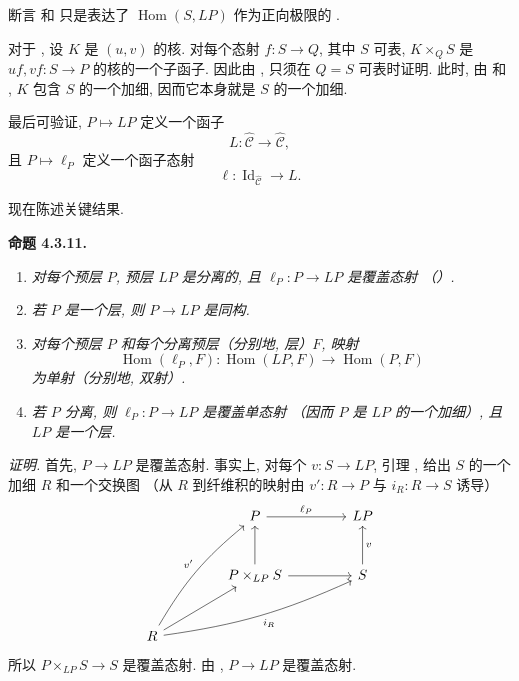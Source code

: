 断言  和
只是表达了 \(\operatorname{Hom}(S,LP)\) 作为正向极限的
.

对于 ,
设 \(K\) 是 \((u,v)\) 的核.
对每个态射 \(f:S\to Q\), 其中 \(S\) 可表,
\(K\times_QS\) 是 \(uf,vf:S\to P\) 的核的一个子函子.
因此由 ,
只须在 \(Q=S\) 可表时证明.
此时, 由  和
,
\(K\) 包含 \(S\) 的一个加细, 因而它本身就是 \(S\) 的一个加细.

最后可验证, \(P\mapsto LP\) 定义一个函子
\[
 L:\widehat{\mathscr C}\longrightarrow\widehat{\mathscr C},
\]
且 \(P\mapsto\ell_P\) 定义一个函子态射
\[
 \ell:\operatorname{Id}_{\widehat{\mathscr C}}\longrightarrow L.
\]

现在陈述关键结果.

\medskip
\noindent{}\textbf{命题 4.3.11.}
\begin{enumerate}
 \item[(i)] \textit{对每个预层
 \(P\), 预层 \(LP\) 是分离的, 且 \(\ell_P:P\to LP\) 是覆盖态射
 （）.}
 \item[(ii)] \textit{若 \(P\)
 是一个层, 则 \(P\to LP\) 是同构.}
 \item[(iii)] \textit{对每个预层
 \(P\) 和每个分离预层（分别地, 层）\(F\), 映射}
 \[
  \operatorname{Hom}(\ell_P,F):
  \operatorname{Hom}(LP,F)\longrightarrow\operatorname{Hom}(P,F)
 \]
 \textit{为单射（分别地, 双射）.}
 \item[(iv)] \textit{若 \(P\)
 分离, 则 \(\ell_P:P\to LP\) 是覆盖单态射
 （因而 \(P\) 是 \(LP\) 的一个加细）, 且 \(LP\) 是一个层.}
\end{enumerate}

\noindent\textit{证明.}
 首先,
\(P\to LP\) 是覆盖态射. 事实上, 对每个 \(v:S\to LP\),
引理 ,
给出 \(S\) 的一个加细 \(R\) 和一个交换图
（从 \(R\) 到纤维积的映射由 \(v':R\to P\) 与 \(i_R:R\to S\) 诱导）
\[
\begin{tikzcd}[column sep=4.2em,row sep=2.8em]
 {}
 &
 P
   \arrow[r,"\ell_P"]
 &
 LP
 \\
 {}
 &
 P\times_{LP}S
   \arrow[u]
   \arrow[r]
 &
 S
   \arrow[u,"v"']
 \\
 R
   \arrow[ru]
   \arrow[ruu,bend left=10,"v'"]
   \arrow[rru,bend right=8,"i_R"']
 &
 {}
 &
 {}
\end{tikzcd}
\]
所以 \(P\times_{LP}S\to S\) 是覆盖态射.
由 ,
\(P\to LP\) 是覆盖态射.

